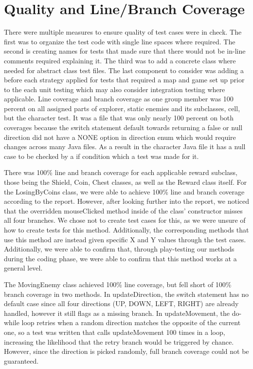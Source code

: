 \documentclass[12pt,letterpaper]{article}
\begin{document}
\section{ Quality and Line/Branch Coverage}
There were multiple measures to ensure quality of test cases were in check. The first was to organize the test code with single line spaces where required. The second is creating names for tests that made sure that there would not be in-line comments required explaining it. The third was to add a concrete class where needed for abstract class test files. The last component to consider was adding a before each strategy applied for tests that required a map and game set up prior to the each unit testing which may also consider integration testing where applicable. Line coverage and branch coverage as one group member was 100 percent on all assigned parts of explorer, static enemies and its subclasses, cell, but the character test. It was a file that was only nearly 100 percent on both coverages because the switch statement default towards returning a false or null direction did not have a NONE option in direction enum which would require changes across many Java files. As a result in the character Java file it has a null case to be checked by a if condition which a test was made for it.

There was 100\% line and branch coverage for each applicable reward subclass, those being the Shield, Coin, Chest classes, as well as the Reward class itself.
For the LosingByCoins class, we were able to achieve 100\% line and branch coverage according to the report. However, after looking further into the report, we noticed that the overridden mouseClicked method inside of the class' constructor misses all four branches. We chose not to create test cases for this, as we were unsure of how to create tests for this method. Additionally, the corresponding methods that use this method are instead given specific X and Y values through the test cases. Additionally, we were able to confirm that, through play-testing our methods during the coding phase, we were able to confirm that this method works at a general level.

The MovingEnemy class achieved 100\% line coverage, but fell short of 100\% branch coverage in two methods. In updateDirection, the switch statement has no default case since all four directions (UP, DOWN, LEFT, RIGHT) are already handled, however it still flags as a missing branch. In updateMovement, the do-while loop retries when a random direction matches the opposite of the current one, so a test was written that calls updateMovement 100 times in a loop, increasing the likelihood that the retry branch would be triggered by chance. However, since the direction is picked randomly, full branch coverage could not be guaranteed.
\end{document}
